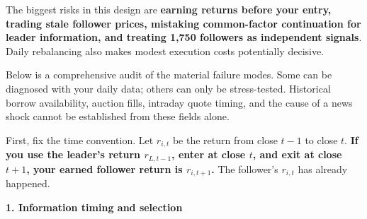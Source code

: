 The biggest risks in this design are \textbf{earning returns before your entry, trading stale follower prices, mistaking common-factor continuation for leader information, and treating 1,750 followers as independent signals}. Daily rebalancing also makes modest execution costs potentially decisive.

Below is a comprehensive audit of the material failure modes. Some can be diagnosed with your daily data; others can only be stress-tested. Historical borrow availability, auction fills, intraday quote timing, and the cause of a news shock cannot be established from these fields alone.

First, fix the time convention. Let \(r_{i,t}\) be the return from close \(t-1\) to close \(t\). \textbf{If you use the leader's return \(r_{L,t-1}\), enter at close \(t\), and exit at close \(t+1\), your earned follower return is \(r_{i,t+1}\).} The follower's \(r_{i,t}\) has already happened.

\textbf{1. Information timing and selection}


